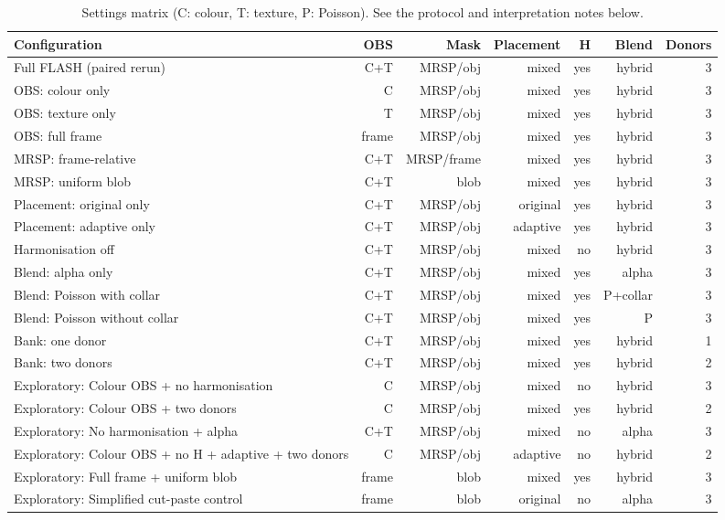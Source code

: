 \begin{table}[t]
\centering
\scriptsize
\caption{Settings matrix (C: colour, T: texture, P: Poisson). See the protocol and interpretation notes below.}
\begin{tabular}{lrrrrrr}
\hline
Configuration & OBS & Mask & Placement & H & Blend & Donors \\
\hline
Full FLASH (paired rerun) & C+T & MRSP/obj & mixed & yes & hybrid & 3 \\
OBS: colour only & C & MRSP/obj & mixed & yes & hybrid & 3 \\
OBS: texture only & T & MRSP/obj & mixed & yes & hybrid & 3 \\
OBS: full frame & frame & MRSP/obj & mixed & yes & hybrid & 3 \\
MRSP: frame-relative & C+T & MRSP/frame & mixed & yes & hybrid & 3 \\
MRSP: uniform blob & C+T & blob & mixed & yes & hybrid & 3 \\
Placement: original only & C+T & MRSP/obj & original & yes & hybrid & 3 \\
Placement: adaptive only & C+T & MRSP/obj & adaptive & yes & hybrid & 3 \\
Harmonisation off & C+T & MRSP/obj & mixed & no & hybrid & 3 \\
Blend: alpha only & C+T & MRSP/obj & mixed & yes & alpha & 3 \\
Blend: Poisson with collar & C+T & MRSP/obj & mixed & yes & P+collar & 3 \\
Blend: Poisson without collar & C+T & MRSP/obj & mixed & yes & P & 3 \\
Bank: one donor & C+T & MRSP/obj & mixed & yes & hybrid & 1 \\
Bank: two donors & C+T & MRSP/obj & mixed & yes & hybrid & 2 \\
Exploratory: Colour OBS + no harmonisation & C & MRSP/obj & mixed & no & hybrid & 3 \\
Exploratory: Colour OBS + two donors & C & MRSP/obj & mixed & yes & hybrid & 2 \\
Exploratory: No harmonisation + alpha & C+T & MRSP/obj & mixed & no & alpha & 3 \\
Exploratory: Colour OBS + no H + adaptive + two donors & C & MRSP/obj & adaptive & no & hybrid & 2 \\
Exploratory: Full frame + uniform blob & frame & blob & mixed & yes & hybrid & 3 \\
Exploratory: Simplified cut-paste control & frame & blob & original & no & alpha & 3 \\
\hline
\end{tabular}
\end{table}

